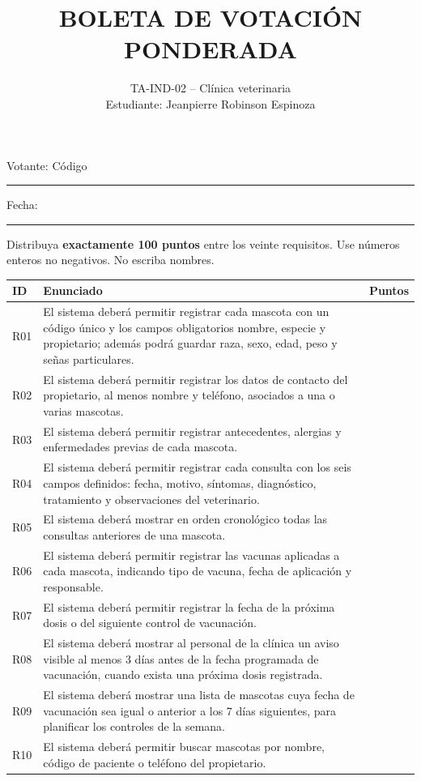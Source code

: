 \documentclass[11pt,a4paper]{article}
\title{\textbf{BOLETA DE VOTACI\'{O}N PONDERADA}}
\author{TA-IND-02 -- Cl\'{i}nica veterinaria\\
Estudiante: Jeanpierre Robinson Espinoza}
\date{}
\begin{document}
\maketitle

\noindent Votante: C\'{o}digo \rule{2.2cm}{0.4pt}\quad Fecha: \rule{2.2cm}{0.4pt}

\noindent Distribuya \textbf{exactamente 100 puntos} entre los veinte requisitos. Use n\'{u}meros enteros no negativos. No escriba nombres.

\vspace{0.3cm}

\begin{longtable}{@{}lp{13.5cm}r@{}}
\toprule
ID & Enunciado & Puntos \\
\midrule
\endhead
R01 & El sistema deberá permitir registrar cada mascota con un código único y los campos obligatorios nombre, especie y propietario; además podrá guardar raza, sexo, edad, peso y señas particulares. & \\
R02 & El sistema deberá permitir registrar los datos de contacto del propietario, al menos nombre y teléfono, asociados a una o varias mascotas. & \\
R03 & El sistema deberá permitir registrar antecedentes, alergias y enfermedades previas de cada mascota. & \\
R04 & El sistema deberá permitir registrar cada consulta con los seis campos definidos: fecha, motivo, síntomas, diagnóstico, tratamiento y observaciones del veterinario. & \\
R05 & El sistema deberá mostrar en orden cronológico todas las consultas anteriores de una mascota. & \\
R06 & El sistema deberá permitir registrar las vacunas aplicadas a cada mascota, indicando tipo de vacuna, fecha de aplicación y responsable. & \\
R07 & El sistema deberá permitir registrar la fecha de la próxima dosis o del siguiente control de vacunación. & \\
R08 & El sistema deberá mostrar al personal de la clínica un aviso visible al menos 3 días antes de la fecha programada de vacunación, cuando exista una próxima dosis registrada. & \\
R09 & El sistema deberá mostrar una lista de mascotas cuya fecha de vacunación sea igual o anterior a los 7 días siguientes, para planificar los controles de la semana. & \\
R10 & El sistema deberá permitir buscar mascotas por nombre, código de paciente o teléfono del propietario. & \\

\end{longtable}
\end{document}
